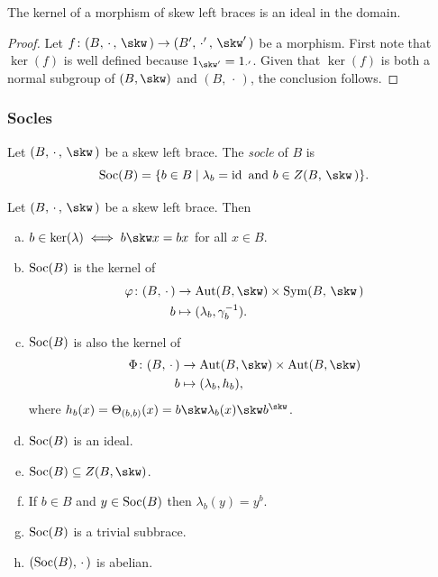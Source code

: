 \begin{prop}
    The kernel of a morphism of skew left braces is an ideal in the domain.
\end{prop}

\begin{proof}
    Let $f\colon(B,\,\cdot\,,\,\skw\,)\to(B',\,\cdot'\,,\,\skw'\,)$ be a morphism. First note that $\ker(f)$ is well defined because $1_{\skw'}=1_{\cdot'}$. Given that $\ker(f)$ is both a normal subgroup of $(B,\skw)$ and $(B,\,\cdot\,)$, the conclusion follows. 
\end{proof}

\subsubsection*{Socles}

\begin{defn}
    Let $(B,\,\cdot\,,\,\skw\,)$ be a skew left brace. The \textsl{socle\/} of $B$ is
    $$
        \Soc(B) = \set{b\in B\mid \lambda_b=\id\text{ and }
            b\in Z(B,\,\skw\,)}.
    $$
\end{defn}

\begin{thm}
    Let\/ $(B,\,\cdot\,,\,\skw\,)$ be a skew left brace. Then
    \begin{enumerate}[a),font=\upshape]
        \item $b\in\ker(\lambda)\iff b\skw x=bx$ for all\/ $x\in B$.
        \item ${\rm Soc}(B)$ is the kernel of
            \begin{align*}
                \varphi\colon(B,\,\cdot\,)
                    &\to\Aut(B,\skw)\times\Sym(B,\,\skw\,)\\
                b
                    &\mapsto(\lambda_b,\gamma_b^{-1}).
            \end{align*}
        \item ${\rm Soc}(B)$ is also the kernel of
            \begin{align*}
                \Phi\colon(B,\,\cdot\,)&\to\Aut(B,\skw)\times\Aut(B,\skw)\\
                    b&\mapsto(\lambda_b,h_b),
            \end{align*}
            where\/ $h_b(x)=\Theta_{(b,b)}(x)=b\skw\lambda_b(x)\skw b^\skw$.
        \item ${\rm Soc}(B)$ is an ideal.
        \item $\Soc(B)\subseteq Z(B,\skw)$.
        \item If\/ $b\in B$ and\/ $y\in{\rm Soc}(B)$ then\/ $\lambda_b(y)= y^b$.
        \item ${\rm Soc}(B)$ is a trivial subbrace.
        \item $({\rm Soc}(B),\,\cdot\,)$ is abelian.
    \end{enumerate}
\end{thm}

